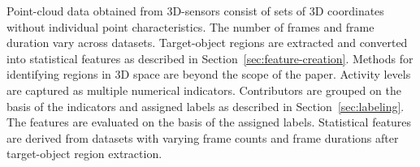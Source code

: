 Point-cloud data obtained from 3D-sensors consist of sets of 3D coordinates without individual point characteristics.
The number of frames and frame duration vary across datasets.
Target-object regions are extracted and converted into statistical features as described in Section~\ref{sec:feature-creation}.
Methods for identifying regions in 3D space are beyond the scope of the paper.
Activity levels are captured as multiple numerical indicators.
Contributors are grouped on the basis of the indicators and assigned labels as described in Section~\ref{sec:labeling}.
The features are evaluated on the basis of the assigned labels.
Statistical features are derived from datasets with varying frame counts and frame durations after target-object region extraction.
